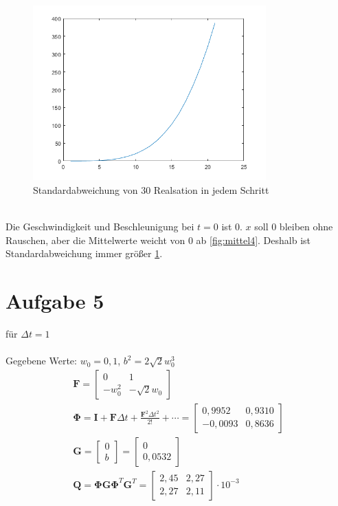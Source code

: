 \begin{figure}[htbp]
	\centering
	\includegraphics[width=0.8\textwidth]{images/var4} 
	\caption{Standardabweichung von 30 Realsation in jedem Schritt} 
	\label{fig:var4}
\end{figure}\\
Die Geschwindigkeit und Beschleunigung bei $t=0$ ist 0. $x$ soll 0 bleiben ohne Rauschen, aber die Mittelwerte weicht von 0 ab \ref{fig:mittel4}. Deshalb ist Standardabweichung immer größer \ref{fig:var4}.
\clearpage
\section{Aufgabe 5}
für $\Delta t = 1$\\\\
Gegebene Werte: $w_0 = 0,1$, $b^2 = 2\sqrt{2}w_0^3$
\begin{gather}
	\bm{F} = \begin{bmatrix}
	0 & 1 \\
	-w_0^2 & -\sqrt{2}w_0
	\end{bmatrix} \\
	\bm{\Phi} = \bm{I} + \bm{F} \Delta t + \frac{\bm{F}^2 \Delta t^2}{2!} + \cdots = \begin{bmatrix}
	0,9952 & 0,9310 \\
	-0,0093 & 0,8636 
	\end{bmatrix}\\
	 \bm{G} = \begin{bmatrix}
	 0\\
	 b
	 \end{bmatrix} = \begin{bmatrix}
	 0 \\
	 0,0532
	 \end{bmatrix}\\
	 \bm{Q} = \bm{\Phi} \bm{G} \bm{\Phi}^T \bm{G}^T = \begin{bmatrix}
	 2,45 & 2,27 \\
	 2,27 & 2,11
	 \end{bmatrix} \cdot 10^{-3}
\end{gather}
